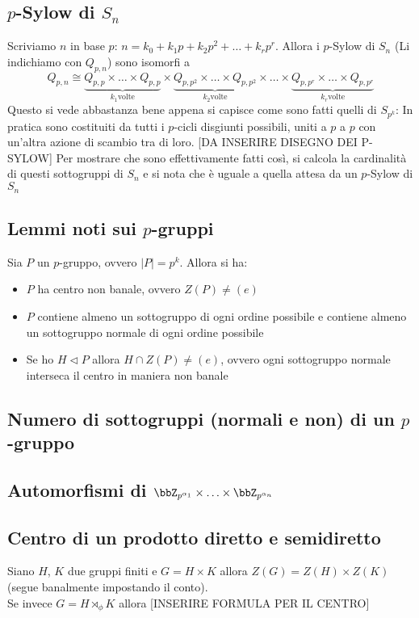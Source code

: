 \documentclass[a4paper,NoNotes,GeneralMath]{stdmdoc}
\newcommand{\nrm}{\lhd}
\begin{document}
	\subsection{$p$-Sylow di $S_n$}
	Scriviamo $n$ in base $p$: $n = k_0 + k_1 p + k_2 p^2 + \ldots + k_r p^r$. Allora i $p$-Sylow di $S_n$ (Li indichiamo con $Q_{p, n}$) sono isomorfi a
	$$ Q_{p,n} \cong \underbrace{Q_{p, p} \times \ldots \times Q_{p,p}}_{k_1 \text{volte}} \times \underbrace{Q_{p, p^2} \times \ldots \times Q_{p, p^2}}_{k_2 \text{volte}} \times \ldots \times \underbrace{Q_{p, p^r} \times \ldots \times Q_{p,p^r}}_{k_r \text{volte}} $$
	Questo si vede abbastanza bene appena si capisce come sono fatti quelli di $S_{p^k}$: In pratica sono costituiti da tutti i $p$-cicli disgiunti possibili, uniti a $p$ a $p$ con un'altra azione di scambio tra di loro.
	[DA INSERIRE DISEGNO DEI P-SYLOW]
	Per mostrare che sono effettivamente fatti così, si calcola la cardinalità di questi sottogruppi di $S_n$ e si nota che è uguale a quella attesa da un $p$-Sylow di $S_n$
	
	
	\subsection{Lemmi noti sui $p$-gruppi}
	Sia $P$ un $p$-gruppo, ovvero $\mid P \mid = p^k$. Allora si ha:
	\begin{itemize}
		\item $P$ ha centro non banale, ovvero $Z(P) \neq (e)$
		\item $P$ contiene almeno un sottogruppo di ogni ordine possibile e contiene almeno un sottogruppo normale di ogni ordine possibile
		\item Se ho $H \nrm P$ allora $H \cap Z(P) \neq (e)$, ovvero ogni sottogruppo normale interseca il centro in maniera non banale
	\end{itemize}
	
	\subsection{Numero di sottogruppi (normali e non) di un $p$-gruppo}
	
	\subsection{Automorfismi di $\bbZ_{p^{\alpha_1}} \times \ldots \times \bbZ_{p^{\alpha_n}}$}
	
	\subsection{Centro di un prodotto diretto e semidiretto}
	Siano $H$, $K$ due gruppi finiti e $G = H \times K$ allora $Z(G) = Z(H) \times Z(K)$ (segue banalmente impostando il conto). \\
	Se invece $G = H \rtimes_\phi K$ allora [INSERIRE FORMULA PER IL CENTRO]
	
\end{document}
